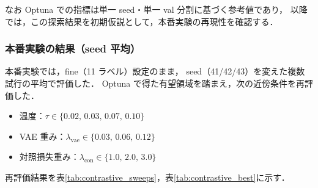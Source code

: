 なお Optuna での指標は単一 seed・単一 val 分割に基づく参考値であり，
以降では，この探索結果を初期仮説として，本番実験の再現性を確認する．

\subsubsection{本番実験の結果（seed 平均）}
\label{subsubsec:contrastive_main_results}

本番実験では，fine（11 ラベル）設定のまま，
seed（41/42/43）を変えた複数試行の平均で評価した．
Optuna で得た有望領域を踏まえ，次の近傍条件を再評価した．
\begin{itemize}
  \item 温度：$\tau \in \{0.02,\,0.03,\,0.07,\,0.10\}$
  \item VAE 重み：$\lambda_{\mathrm{vae}} \in \{0.03,\,0.06,\,0.12\}$
  \item 対照損失重み：$\lambda_{\mathrm{con}} \in \{1.0,\,2.0,\,3.0\}$
\end{itemize}
再評価結果を表\ref{tab:contrastive_sweeps}，表\ref{tab:contrastive_best}に示す．



